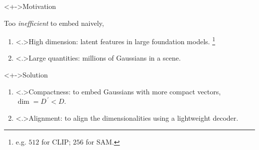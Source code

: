 \begin{frame}
	\begin{block}<+->{Motivation}
		\par Too \emph{inefficient} to embed naively,
		\begin{enumerate}[<+->]
			\item \alert<.>{High dimension:} latent features in large foundation models.
			      \footnote{e.g. \(512\) for CLIP; \(256\) for SAM.}
			\item \alert<.>{Large quantities:} millions of Gaussians in a scene.
		\end{enumerate}
	\end{block}
	\begin{block}<+->{Solution}
		\begin{enumerate}[<+->]
			\item \alert<.>{Compactness:} to embed Gaussians with more compact vectors, \(\dim = D^{\,\prime} < D\).
			\item \alert<.>{Alignment:} to align the dimensionalities using a lightweight decoder.
		\end{enumerate}
	\end{block}
\end{frame}

